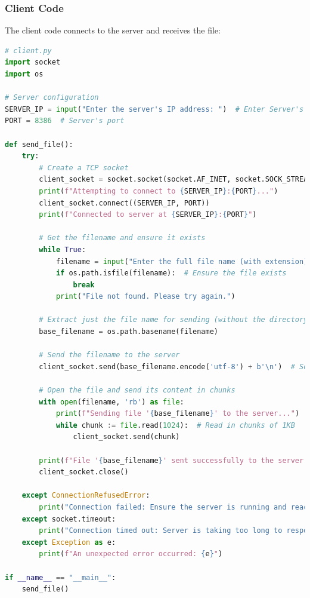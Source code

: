 \documentclass{article}
\begin{document}
\subsubsection{Client Code}
The client code connects to the server and receives the file:
\begin{lstlisting}[language=Python, caption=Client Code]
# client.py
import socket
import os

# Server configuration
SERVER_IP = input("Enter the server's IP address: ")  # Enter Server's IP address
PORT = 8386  # Server's port

def send_file():
    try:
        # Create a TCP socket
        client_socket = socket.socket(socket.AF_INET, socket.SOCK_STREAM)
        print(f"Attempting to connect to {SERVER_IP}:{PORT}...")
        client_socket.connect((SERVER_IP, PORT))
        print(f"Connected to server at {SERVER_IP}:{PORT}")

        # Get the filename and ensure it exists
        while True:
            filename = input("Enter the full file name (with extension): ")
            if os.path.isfile(filename):  # Ensure the file exists
                break
            print("File not found. Please try again.")

        # Extract just the file name for sending (without the directory path)
        base_filename = os.path.basename(filename)

        # Send the filename to the server
        client_socket.send(base_filename.encode('utf-8') + b'\n')  # Send filename with newline delimiter

        # Open the file and send its content in chunks
        with open(filename, 'rb') as file:
            print(f"Sending file '{base_filename}' to the server...")
            while chunk := file.read(1024):  # Read in chunks of 1KB
                client_socket.send(chunk)

        print(f"File '{base_filename}' sent successfully to the server.")
        client_socket.close()

    except ConnectionRefusedError:
        print("Connection failed: Ensure the server is running and reachable.")
    except socket.timeout:
        print("Connection timed out: Server is taking too long to respond.")
    except Exception as e:
        print(f"An unexpected error occurred: {e}")

if __name__ == "__main__":
    send_file()

\end{lstlisting}
\end{document}
